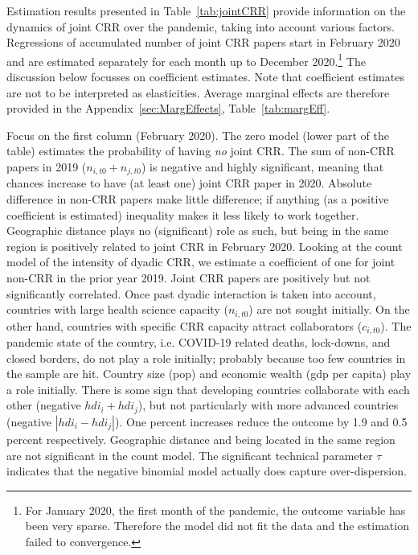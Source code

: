 Estimation results presented in Table~\ref{tab:jointCRR} provide information on the dynamics of joint CRR over the pandemic, taking into account various factors. Regressions of accumulated number of joint CRR papers start in February 2020 and are estimated separately for each month up to December 2020.\footnote{For January 2020, the first month of the pandemic, the outcome variable has been very sparse. Therefore the model did not fit the data and the estimation failed to convergence.} The discussion below focusses on coefficient estimates. Note that coefficient estimates are not to be interpreted as elasticities. Average marginal effects are therefore provided in the Appendix~\ref{sec:MargEffects}, Table~\ref{tab:margEff}. 

Focus on the first column (February 2020). The zero model (lower part of the table) estimates the probability of having \textit{no} joint CRR. The sum of non-CRR papers in 2019 ($n_{i,t0} + n_{j,t0}$) is negative and highly significant, meaning that chances increase to have (at least one) joint CRR paper in 2020. Absolute difference in non-CRR papers make little difference; if anything (as a positive coefficient is estimated) inequality makes it less likely to work together. Geographic distance plays no (significant) role as such, but being in the same region is positively related to joint CRR in February 2020. Looking at the count model of the intensity of dyadic CRR, we estimate a coefficient of one for joint non-CRR in the prior year 2019. Joint CRR papers are positively but not significantly correlated. Once past dyadic interaction is taken into account, countries with large health science capacity ($n_{i,t0}$) are not sought initially. On the other hand, countries with specific CRR capacity attract collaborators ($c_{i,t0}$). The pandemic state of the country, i.e. COVID-19 related deaths, lock-downs, and closed borders, do not play a role initially; probably because too few countries in the sample are hit. Country size (pop) and economic wealth (gdp per capita) play a role initially. There is some sign that developing countries collaborate with each other (negative $hdi_i + hdi_j$), but not particularly with more advanced countries (negative $|hdi_i - hdi_j|$). One percent increases reduce the outcome by 1.9 and 0.5 percent respectively. Geographic distance and being located in the same region are not significant in the count model. The significant technical parameter $\tau$ indicates that the negative binomial model actually does capture over-dispersion.


